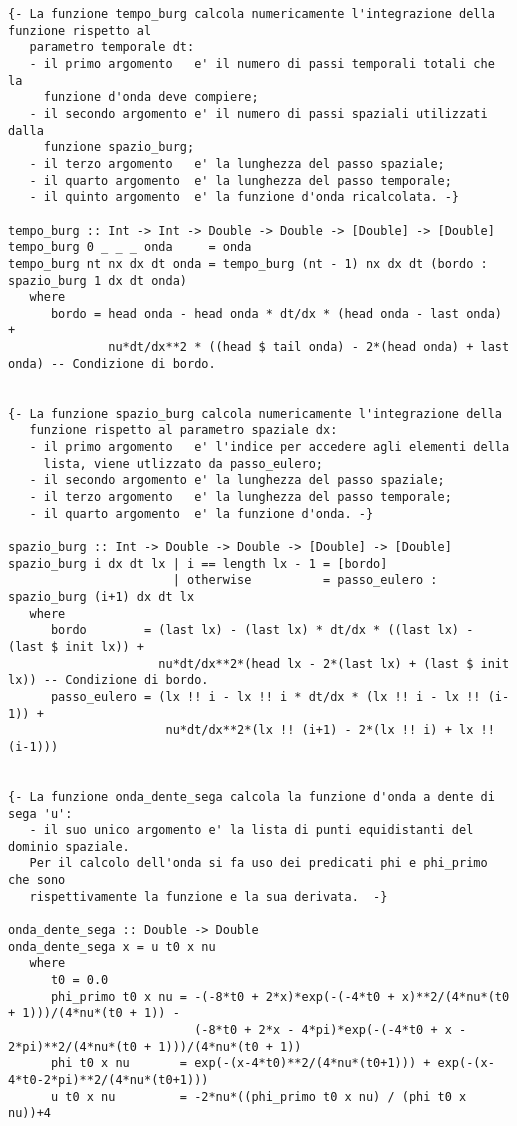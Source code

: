 \begin{verbatim}
{- La funzione tempo_burg calcola numericamente l'integrazione della funzione rispetto al 
   parametro temporale dt:
   - il primo argomento   e' il numero di passi temporali totali che la
     funzione d'onda deve compiere; 
   - il secondo argomento e' il numero di passi spaziali utilizzati dalla
     funzione spazio_burg;       
   - il terzo argomento   e' la lunghezza del passo spaziale;
   - il quarto argomento  e' la lunghezza del passo temporale;
   - il quinto argomento  e' la funzione d'onda ricalcolata. -}

tempo_burg :: Int -> Int -> Double -> Double -> [Double] -> [Double]
tempo_burg 0 _ _ _ onda     = onda
tempo_burg nt nx dx dt onda = tempo_burg (nt - 1) nx dx dt (bordo : spazio_burg 1 dx dt onda)
   where
      bordo = head onda - head onda * dt/dx * (head onda - last onda) +
              nu*dt/dx**2 * ((head $ tail onda) - 2*(head onda) + last onda) -- Condizione di bordo.


{- La funzione spazio_burg calcola numericamente l'integrazione della
   funzione rispetto al parametro spaziale dx:
   - il primo argomento   e' l'indice per accedere agli elementi della 
     lista, viene utlizzato da passo_eulero; 
   - il secondo argomento e' la lunghezza del passo spaziale;
   - il terzo argomento   e' la lunghezza del passo temporale;
   - il quarto argomento  e' la funzione d'onda. -}

spazio_burg :: Int -> Double -> Double -> [Double] -> [Double]
spazio_burg i dx dt lx | i == length lx - 1 = [bordo]
                       | otherwise          = passo_eulero : spazio_burg (i+1) dx dt lx
   where
      bordo        = (last lx) - (last lx) * dt/dx * ((last lx) - (last $ init lx)) +
                     nu*dt/dx**2*(head lx - 2*(last lx) + (last $ init lx)) -- Condizione di bordo.
      passo_eulero = (lx !! i - lx !! i * dt/dx * (lx !! i - lx !! (i-1)) + 
                      nu*dt/dx**2*(lx !! (i+1) - 2*(lx !! i) + lx !! (i-1)))


{- La funzione onda_dente_sega calcola la funzione d'onda a dente di sega 'u':
   - il suo unico argomento e' la lista di punti equidistanti del dominio spaziale. 
   Per il calcolo dell'onda si fa uso dei predicati phi e phi_primo che sono 
   rispettivamente la funzione e la sua derivata.  -}

onda_dente_sega :: Double -> Double
onda_dente_sega x = u t0 x nu
   where
      t0 = 0.0                                                                              
      phi_primo t0 x nu = -(-8*t0 + 2*x)*exp(-(-4*t0 + x)**2/(4*nu*(t0 + 1)))/(4*nu*(t0 + 1)) - 
                          (-8*t0 + 2*x - 4*pi)*exp(-(-4*t0 + x - 2*pi)**2/(4*nu*(t0 + 1)))/(4*nu*(t0 + 1))       
      phi t0 x nu       = exp(-(x-4*t0)**2/(4*nu*(t0+1))) + exp(-(x-4*t0-2*pi)**2/(4*nu*(t0+1)))
      u t0 x nu         = -2*nu*((phi_primo t0 x nu) / (phi t0 x nu))+4



\end{verbatim}
